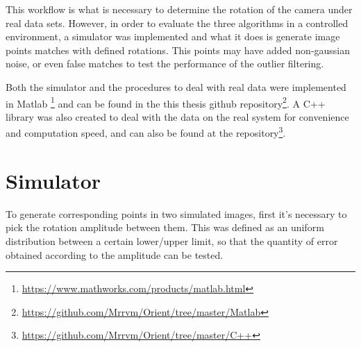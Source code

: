 This workflow is what is necessary to determine the rotation of the camera under real data sets. However, in order to evaluate the three algorithms in a controlled environment, a simulator was implemented and what it does is generate image points matches with defined rotations. This points may have added non-gaussian noise, or even false matches to test the performance of the outlier filtering. 

Both the simulator and the procedures to deal with real data were implemented in Matlab \footnote{\href{https://www.mathworks.com/products/matlab.html}{https://www.mathworks.com/products/matlab.html}} and can be found in the this thesis github repository\footnote{\href{https://github.com/Mrrvm/Orient/tree/master/Matlab}{https://github.com/Mrrvm/Orient/tree/master/Matlab}}. A C++ library was also created to deal with the data on the real system for convenience and computation speed, and can also be found at the repository\footnote{\href{https://github.com/Mrrvm/Orient/tree/master/C++}{https://github.com/Mrrvm/Orient/tree/master/C++}}.

\section{Simulator}

To generate corresponding points in two simulated images, first it's necessary to pick the rotation amplitude between them. This was defined as an uniform distribution between a certain lower/upper limit, so that the quantity of error obtained according to the amplitude can be tested.

